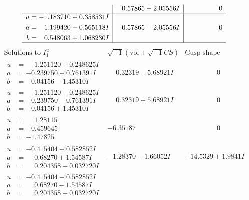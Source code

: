 \documentclass[1p]{elsarticle_modified}
\theoremstyle{definition}
\newcommand{\I}{\sqrt{-1}}
\begin{document}
$$\begin{array}{c|c|c}
 & \phantom{-}0.57865 + 2.05556 I & \phantom{-0.000000 } 0 \\ \hline\begin{aligned}
u &= -1.183710 - 0.358531 I \\
a &= \phantom{-}1.199420 - 0.565118 I \\
b &= \phantom{-}0.548063 + 1.068230 I\end{aligned}
 & \phantom{-}0.57865 - 2.05556 I & \phantom{-0.000000 } 0\\
 \hline 
 \end{array}$$\newpage$$\begin{array}{c|c|c}  
\text{Solutions to }I^u_{1}& \I (\text{vol} + \sqrt{-1}CS) & \text{Cusp shape}\\
 \hline 
\begin{aligned}
u &= \phantom{-}1.251120 + 0.248625 I \\
a &= -0.239750 + 0.761391 I \\
b &= -0.04156 - 1.45310 I\end{aligned}
 & \phantom{-}0.32319 - 5.68921 I & \phantom{-0.000000 } 0 \\ \hline\begin{aligned}
u &= \phantom{-}1.251120 - 0.248625 I \\
a &= -0.239750 - 0.761391 I \\
b &= -0.04156 + 1.45310 I\end{aligned}
 & \phantom{-}0.32319 + 5.68921 I & \phantom{-0.000000 } 0 \\ \hline\begin{aligned}
u &= \phantom{-}1.28115\phantom{ +0.000000I} \\
a &= -0.459645\phantom{ +0.000000I} \\
b &= -1.47825\phantom{ +0.000000I}\end{aligned}
 & -6.35187\phantom{ +0.000000I} & \phantom{-0.000000 } 0 \\ \hline\begin{aligned}
u &= -0.415404 + 0.582852 I \\
a &= \phantom{-}0.68270 + 1.54587 I \\
b &= \phantom{-}0.204358 - 0.032720 I\end{aligned}
 & -1.28370 - 1.66052 I & -14.5329 + 1.9841 I \\ \hline\begin{aligned}
u &= -0.415404 - 0.582852 I \\
a &= \phantom{-}0.68270 - 1.54587 I \\
b &= \phantom{-}0.204358 + 0.032720 I\end{aligned}

\end{array}$$
\end{document}
